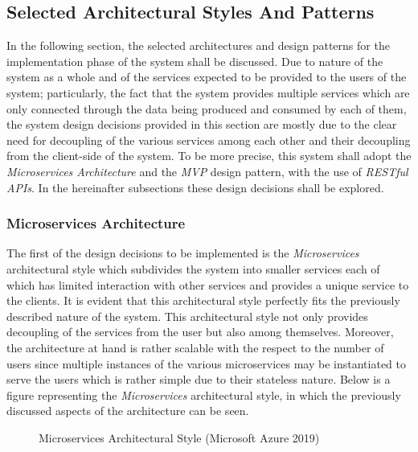 \subsection{Selected Architectural Styles And Patterns}
In the following section, the selected architectures and design patterns for the implementation phase of the system shall be discussed. Due to nature of the system as a whole and of the services expected to be provided to the users of the system; particularly, the fact that the system provides multiple services which are only connected through the data being produced and consumed by each of them, the system design decisions provided in this section are mostly due to the clear need for decoupling of the various services among each other and their decoupling from the client-side of the system. To be more precise, this system shall adopt the \emph{Microservices Architecture} and the \emph{MVP} design pattern, with the use of \emph{RESTful APIs}. In the hereinafter subsections these design decisions shall be explored.

\subsubsection{Microservices Architecture}
The first of the design decisions to be implemented is the \emph{Microservices} architectural style which subdivides the system into smaller services each of which has limited interaction with other services and provides a unique service to the clients. It is evident that this architectural style perfectly fits the previously described nature of the system. This architectural style not only provides decoupling of the services from the user but also among themselves. Moreover, the architecture at hand is rather scalable with the respect to the number of users since multiple instances of the various microservices may be instantiated to serve the users which is rather simple due to their stateless nature. Below is a figure representing the \emph{Microservices} architectural style, in which the previously discussed aspects of the architecture can be seen.

\begin{figure}[H]
\caption{Microservices Architectural Style (Microsoft Azure 2019)}
\label{fig:MS-arch-style}
\centering

\end{figure}

